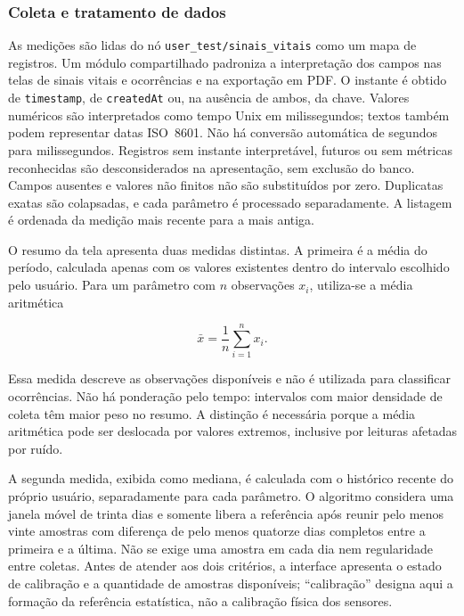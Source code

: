 \documentclass[12pt]{article}
\begin{document}
\subsubsection{Coleta e tratamento de dados}

As medições são lidas do nó \texttt{user\_test/sinais\_vitais} como um mapa de registros. Um módulo compartilhado padroniza a interpretação dos campos nas telas de sinais vitais e ocorrências e na exportação em PDF. O instante é obtido de \texttt{timestamp}, de \texttt{createdAt} ou, na ausência de ambos, da chave. Valores numéricos são interpretados como tempo Unix em milissegundos; textos também podem representar datas ISO~8601. Não há conversão automática de segundos para milissegundos. Registros sem instante interpretável, futuros ou sem métricas reconhecidas são desconsiderados na apresentação, sem exclusão do banco. Campos ausentes e valores não finitos não são substituídos por zero. Duplicatas exatas são colapsadas, e cada parâmetro é processado separadamente. A listagem é ordenada da medição mais recente para a mais antiga.

O resumo da tela apresenta duas medidas distintas. A primeira é a média do período, calculada apenas com os valores existentes dentro do intervalo escolhido pelo usuário. Para um parâmetro com $n$ observações $x_i$, utiliza-se a média aritmética

\begin{equation}
    \bar{x}=\frac{1}{n}\sum_{i=1}^{n}x_i.
    \label{eq:media-periodo}
\end{equation}

Essa medida descreve as observações disponíveis e não é utilizada para classificar ocorrências. Não há ponderação pelo tempo: intervalos com maior densidade de coleta têm maior peso no resumo. A distinção é necessária porque a média aritmética pode ser deslocada por valores extremos, inclusive por leituras afetadas por ruído.

A segunda medida, exibida como mediana, é calculada com o histórico recente do próprio usuário, separadamente para cada parâmetro. O algoritmo considera uma janela móvel de trinta dias e somente libera a referência após reunir pelo menos vinte amostras com diferença de pelo menos quatorze dias completos entre a primeira e a última. Não se exige uma amostra em cada dia nem regularidade entre coletas. Antes de atender aos dois critérios, a interface apresenta o estado de calibração e a quantidade de amostras disponíveis; ``calibração'' designa aqui a formação da referência estatística, não a calibração física dos sensores.
\end{document}
